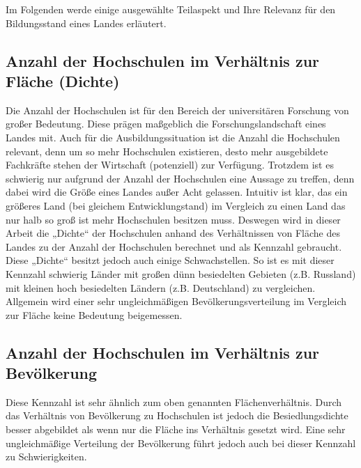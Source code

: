 Im Folgenden werde einige ausgewählte Teilaspekt und Ihre Relevanz für den Bildungsstand eines Landes erläutert.

\subsection{Anzahl der Hochschulen im Verhältnis zur Fläche (Dichte)}
Die Anzahl der Hochschulen ist für den Bereich der universitären Forschung von großer Bedeutung. Diese prägen maßgeblich die Forschungslandschaft eines Landes mit. Auch für die Ausbildungssituation ist die Anzahl die Hochschulen relevant, denn um so mehr Hochschulen existieren, desto mehr ausgebildete Fachkräfte stehen der Wirtschaft (potenziell) zur Verfügung. 
Trotzdem ist es schwierig nur aufgrund der Anzahl der Hochschulen eine Aussage zu treffen, denn dabei wird die Größe eines Landes außer Acht gelassen. Intuitiv ist klar, das ein größeres Land (bei gleichem Entwicklungstand) im Vergleich zu einen Land das nur halb so groß ist mehr Hochschulen besitzen muss. Deswegen wird in dieser Arbeit die „Dichte“ der Hochschulen anhand des Verhältnissen von  Fläche des Landes zu der Anzahl der Hochschulen berechnet und als Kennzahl gebraucht.
Diese „Dichte“ besitzt jedoch auch einige Schwachstellen. So ist es mit dieser Kennzahl schwierig Länder mit großen dünn besiedelten Gebieten (z.B. Russland) mit kleinen hoch besiedelten Ländern (z.B. Deutschland) zu vergleichen. Allgemein wird einer sehr ungleichmäßigen Bevölkerungsverteilung im Vergleich zur Fläche keine Bedeutung beigemessen.

\subsection{Anzahl der Hochschulen im Verhältnis zur Bevölkerung}
Diese Kennzahl ist sehr ähnlich zum oben genannten Flächenverhältnis. Durch das Verhältnis von Bevölkerung zu Hochschulen ist jedoch die Besiedlungsdichte besser abgebildet als wenn nur die Fläche ins Verhältnis gesetzt wird.
Eine sehr ungleichmäßige Verteilung der Bevölkerung führt jedoch auch bei dieser Kennzahl zu Schwierigkeiten.

